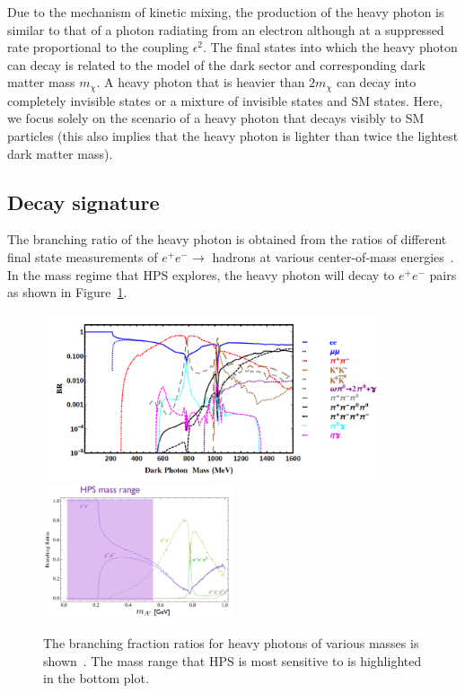 Due to the mechanism of kinetic mixing, the production of the heavy photon is similar to that of a photon radiating from an electron although at a suppressed rate proportional to the coupling $\epsilon^2$. The final states into which the heavy photon can decay is related to the model of the dark sector and corresponding dark matter mass $m_{\chi}$. A heavy photon that is heavier than $2m_{\chi}$ can decay into completely invisible states or a mixture of invisible states and SM states. Here, we focus solely on the scenario of a heavy photon that decays visibly to SM particles (this also implies that the heavy photon is lighter than twice the lightest dark matter mass). 

\subsection{Decay signature}
The branching ratio of the heavy photon is obtained from the ratios of different final state measurements of $e^+e^-\rightarrow $ hadrons at various center-of-mass energies~\cite{liu_signals_2015}. In the mass regime that HPS explores, the heavy photon will decay to $e^+e^-$ pairs as shown in Figure~\ref{Figure:br}. 

\begin{figure}[htb]
  \centering
      \includegraphics[width=0.9\textwidth]{pics/motivation/branchingRatio.png}
 	 \includegraphics[width=0.5\textwidth]{pics/motivation/branchingLinear.png}	
  \caption[The branching fraction ratios for heavy photon decays]{The branching fraction ratios for heavy photons of various masses is shown~\cite{liu_signals_2015}. The mass range that HPS is most sensitive to is highlighted in the bottom plot.}
  \label{Figure:br}
\end{figure}


